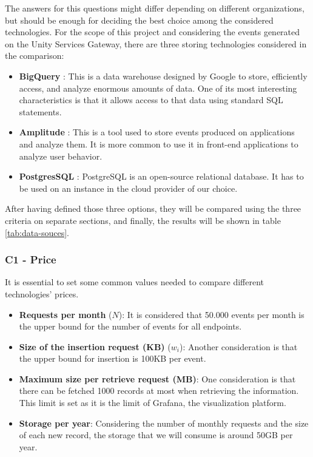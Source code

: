 \documentclass[english, 12pt, a4paper, sci, utf8, a-1b, online]{aaltothesis}
\begin{document}
The answers for this questions might differ depending on different organizations, but should be enough for deciding the best choice among the considered technologies. For the scope of this project and considering the events generated on the Unity Services Gateway, there are three storing technologies considered in the comparison:

\begin{itemize}
    \item \textbf{BigQuery} \cite{BigQuery}: This is a data warehouse designed by Google to store, efficiently access, and analyze enormous amounts of data. One of its most interesting characteristics is that it allows access to that data using standard SQL statements.
    \item \textbf{Amplitude} \cite{Amplitude}: This is a tool used to store events produced on applications and analyze them. It is more common to use it in front-end applications to analyze user behavior.
    \item \textbf{PostgresSQL} \cite{PostgreSQL}: PostgreSQL is an open-source relational database. It has to be used on an instance in the cloud provider of our choice.
\end{itemize}

After having defined those three options, they will be compared using the three criteria on separate sections, and finally, the results will be shown in table \ref{tab:data-souces}.

\subsubsection*{C1 - Price}

It is essential to set some common values needed to compare different technologies' prices.

\begin{itemize}
    \item \textbf{Requests per month} ($N$): It is considered that 50.000 events per month is the upper bound for the number of events for all endpoints.
    \item \textbf{Size of the insertion request (KB)} ($w_i$): Another consideration is that the upper bound for insertion is 100KB per event.
    \item \textbf{Maximum size per retrieve request (MB)}: One consideration is that there can be fetched 1000 records at most when retrieving the information. This limit is set as it is the limit of Grafana, the visualization platform.
    \item \textbf{Storage per year}: Considering the number of monthly requests and the size of each new record, the storage that we will consume is around 50GB per year.
\end{itemize}
\end{document}
